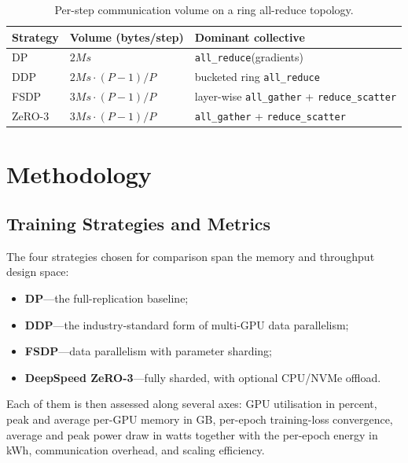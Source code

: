 \begin{table}[h]
\centering
\caption{Per-step communication volume on a ring all-reduce topology.}
\label{tab:dist_comms}
\begin{tabular}{lll}
\toprule
\textbf{Strategy} & \textbf{Volume (bytes/step)} & \textbf{Dominant collective} \\
\midrule
DP        & $2Ms$                          & \texttt{all\_reduce}(gradients) \\
DDP       & $2Ms \cdot (P-1)/P$            & bucketed ring \texttt{all\_reduce} \\
FSDP      & $3Ms \cdot (P-1)/P$            & layer-wise \texttt{all\_gather} + \texttt{reduce\_scatter} \\
ZeRO-3    & $3Ms \cdot (P-1)/P$            & \texttt{all\_gather} + \texttt{reduce\_scatter} \\
\bottomrule
\end{tabular}
\end{table}

\section{Methodology}\label{sec:dist_method}

\subsection{Training Strategies and Metrics}\label{sec:dist_method_metrics}
The four strategies chosen for comparison span the memory and
throughput design space:
\begin{itemize}
    \item \textbf{DP}---the full-replication baseline;
    \item \textbf{DDP}---the industry-standard form of multi-GPU
          data parallelism;
    \item \textbf{FSDP}---data parallelism with parameter sharding;
    \item \textbf{DeepSpeed ZeRO-3}---fully sharded, with optional
          CPU/NVMe offload.
\end{itemize}
Each of them is then assessed along several axes: GPU utilisation
in percent, peak and average per-GPU memory in GB, per-epoch
training-loss convergence, average and peak power draw in watts
together with the per-epoch energy in kWh, communication overhead,
and scaling efficiency.

